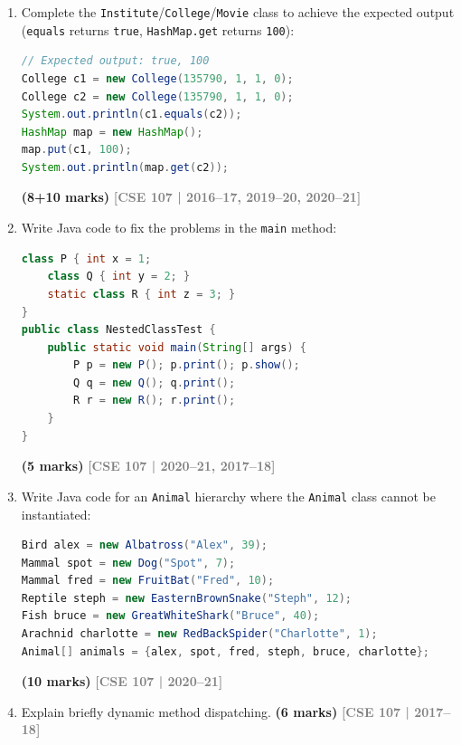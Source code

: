 \documentclass[12pt,a3paper]{article}
\newcommand{\yr}[1]{\hfill\textcolor{gray}{\small\textbf{[#1]}}}
\newcommand{\mk}[1]{\textcolor{orange!70!black}{\small\textbf{(#1 marks)}}}
\begin{document}
\begin{enumerate}
\item Complete the \texttt{Institute}/\texttt{College}/\texttt{Movie} class to achieve the expected output (\texttt{equals} returns \texttt{true}, \texttt{HashMap.get} returns \texttt{100}):
\begin{lstlisting}[language=Java]
// Expected output: true, 100
College c1 = new College(135790, 1, 1, 0);
College c2 = new College(135790, 1, 1, 0);
System.out.println(c1.equals(c2));
HashMap map = new HashMap();
map.put(c1, 100);
System.out.println(map.get(c2));
\end{lstlisting}
\mk{8+10}
\yr{CSE 107 | 2016--17, 2019--20, 2020--21}




\item Write Java code to fix the problems in the \texttt{main} method:
\begin{lstlisting}[language=Java]
class P { int x = 1;
    class Q { int y = 2; }
    static class R { int z = 3; }
}
public class NestedClassTest {
    public static void main(String[] args) {
        P p = new P(); p.print(); p.show();
        Q q = new Q(); q.print();
        R r = new R(); r.print();
    }
}
\end{lstlisting}
\mk{5}
\yr{CSE 107 | 2020--21, 2017--18}




\item Write Java code for an \texttt{Animal} hierarchy where the \texttt{Animal} class cannot be instantiated:
\begin{lstlisting}[language=Java]
Bird alex = new Albatross("Alex", 39);
Mammal spot = new Dog("Spot", 7);
Mammal fred = new FruitBat("Fred", 10);
Reptile steph = new EasternBrownSnake("Steph", 12);
Fish bruce = new GreatWhiteShark("Bruce", 40);
Arachnid charlotte = new RedBackSpider("Charlotte", 1);
Animal[] animals = {alex, spot, fred, steph, bruce, charlotte};
\end{lstlisting}
\mk{10}
\yr{CSE 107 | 2020--21}




\item Explain briefly dynamic method dispatching. \mk{6}
\yr{CSE 107 | 2017--18}


\end{enumerate}
\end{document}
